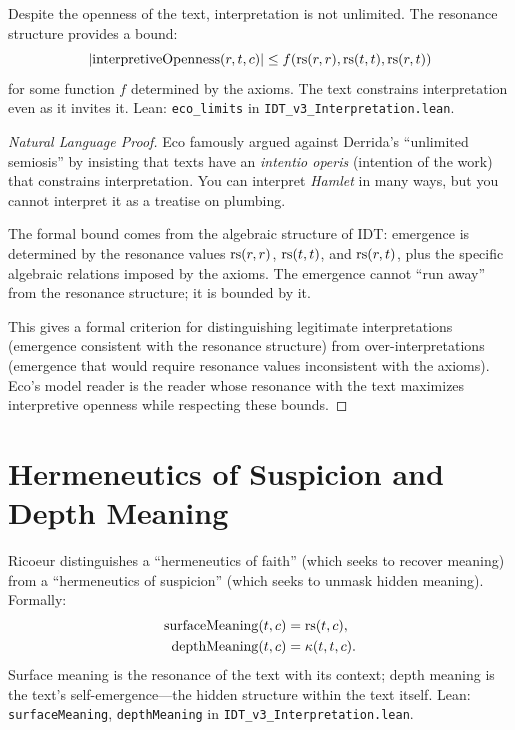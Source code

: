 \begin{theorem}
\label{thm:eco-limits}
Despite the openness of the text, interpretation is not unlimited.
The resonance structure provides a bound:
\[
|\mathrm{interpretiveOpenness}(r, t, c)| \leq f(\mathrm{rs}(r, r), \mathrm{rs}(t, t), \mathrm{rs}(r, t))
\]
for some function $f$ determined by the axioms.  The text constrains
interpretation even as it invites it.
Lean: \texttt{eco\_limits} in \texttt{IDT\_v3\_Interpretation.lean}.
\end{theorem}

\begin{proof}[Natural Language Proof]
Eco famously argued against Derrida's ``unlimited semiosis'' by insisting
that texts have an \textit{intentio operis} (intention of the work) that
constrains interpretation.  You can interpret \textit{Hamlet} in many ways,
but you cannot interpret it as a treatise on plumbing.

The formal bound comes from the algebraic structure of IDT: emergence is
determined by the resonance values $\mathrm{rs}(r, r)$, $\mathrm{rs}(t, t)$, and $\mathrm{rs}(r, t)$,
plus the specific algebraic relations imposed by the axioms.  The emergence
cannot ``run away'' from the resonance structure; it is bounded by it.

This gives a formal criterion for distinguishing legitimate interpretations
(emergence consistent with the resonance structure) from over-interpretations
(emergence that would require resonance values inconsistent with the axioms).
Eco's model reader is the reader whose resonance with the text maximizes
interpretive openness while respecting these bounds.
\end{proof}

\section{Hermeneutics of Suspicion and Depth Meaning}

\begin{definition}
\label{def:surface-depth}
Ricoeur distinguishes a ``hermeneutics of faith'' (which seeks to recover
meaning) from a ``hermeneutics of suspicion'' (which seeks to unmask hidden
meaning).  Formally:
\begin{align}
\mathrm{surfaceMeaning}(t, c) &= \mathrm{rs}(t, c), \\
\mathrm{depthMeaning}(t, c) &= \kappa(t, t, c).
\end{align}
Surface meaning is the resonance of the text with its context; depth meaning
is the text's self-emergence---the hidden structure within the text itself.
Lean: \texttt{surfaceMeaning}, \texttt{depthMeaning} in
\texttt{IDT\_v3\_Interpretation.lean}.
\end{definition}

